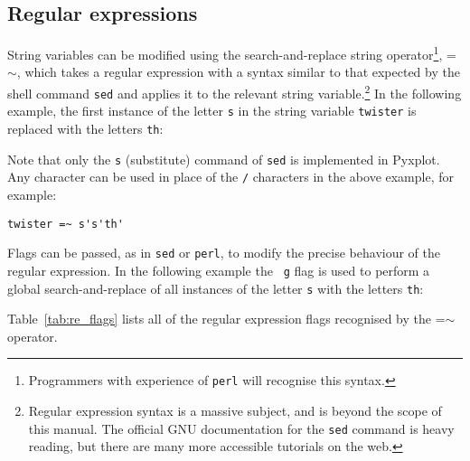 \subsection{Regular expressions}

String variables can be modified using the search-and-replace string
operator\footnote{Programmers with
experience of {\tt perl} will recognise this syntax.}, =$\sim$, which takes a regular expression with a syntax similar to that
expected by the shell command {\tt sed} and applies it to the relevant string variable.\footnote{Regular
expression syntax is a massive subject, and is beyond the scope of this manual.
The official GNU documentation for the {\tt sed} command is heavy reading, but
there are many more accessible tutorials on the web.} In the following example, the first instance of the letter {\tt s} in
the string variable {\tt twister} is replaced with the letters {\tt th}:

\vspace{3mm}

\vspace{3mm}

Note that only the {\tt s} (substitute) command of {\tt sed} is implemented in
Pyxplot. Any character can be used in place of the {\tt /} characters in the
above example, for example:

\begin{verbatim}
twister =~ s's'th'
\end{verbatim}

\noindent Flags can be passed, as in {\tt sed} or {\tt perl}, to modify the
precise behaviour of the regular expression. In the following example the {\tt
g} flag is used to perform a global search-and-replace of all instances of the
letter {\tt s} with the letters {\tt th}:

\vspace{3mm}

\vspace{3mm}

\noindent Table~\ref{tab:re_flags} lists all of the regular expression flags
recognised by the =$\sim$ operator.

